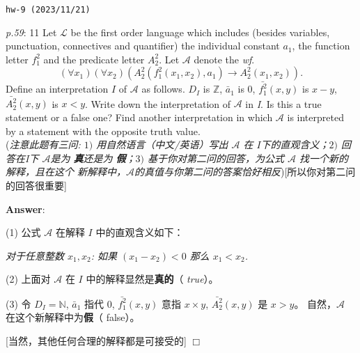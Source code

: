 \documentclass[UTF8,12pt,a4paper]{ctexart}
\begin{document}
\noindent\texttt{hw-9 (2023/11/21)}

\emph{p.59}: 11 \quad
Let $\mathscr{L}$ be the first order language which includes (besides variables, punctuation, 
connectives and quantifier) the individual constant $a_1$, the function letter $f^2_1$ and the predicate letter $A^2_2$. 
Let $\mathscr{A}$ denote the \textit{wf}.
\[
(\forall x_1)(\forall x_2)( A^2_2 ( f^2_1(x_1,x_2), a_1)  \to A^2_2 (x_1,x_2) ).
\]
Define an interpretation $I$ of $\mathscr{A}$ as follows. 
$D_I$ is $\mathbb{Z}$, $\bar{a}_1$ is $0$, $\bar{f^2_1} (x, y)$ is $x-y$, 
$\bar{A^2_2}(x,y)$ is $x < y$. 
Write down the interpretation of $\mathscr{A}$ in \textit{I}. 
Is this a true statement or a false one? 
Find another interpretation in which $\mathscr{A}$ is interpreted by a statement with the opposite truth value. \\
(\textit{注意此题有三问: $1)$ 用自然语言（中文/英语）写出 $\mathscr{A}$ 在 $I$下的直观含义；$2)$ 回答在\textit{I}下 $\mathscr{A}$是为\textbf{{\color{purple} 真}}还是为\textbf{{\color{purple} 假}}；$3)$ 基于你对第二问的回答，为公式 $\mathscr{A}$ 找一个新的解释，且在这个{\color{purple} 新}解释中，$\mathscr{A}$的真值与你第二问的答案恰好相反})[所以你对第二问的回答很重要]

\noindent\textbf{Answer}:   

(1) 公式 $\mathscr{A}$ 在解释 $I$ 中的直观含义如下： 

\hspace{6em} \textit{对于任意整数 $x_1, x_2$: 如果  $(x_1 - x_2) < 0$ 那么 $x_1 < x_2$.}


(2) 上面对 $\mathscr{A}$ 在 $I$ 中的解释显然是\textbf{真的}（{\color{purple} \textit{true}}）。 


(3) 令 $D_I = \mathbb{N}$, $\bar{a}_1$ 指代 $0$, $\bar{f^2_1} (x, y)$ 意指 $x \times y$,  $\bar{A^2_2}(x,y)$ 是 $x > y$。
自然，$\mathscr{A}$ 在这个新解释中为\textbf{假}（{\color{purple} false}）。
 
[当然，其他任何合理的解释都是可接受的]
\hfill $\Box$
\end{document}

